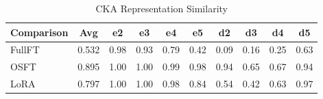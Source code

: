 \begin{table}[t]
\caption{CKA Representation Similarity}
\label{tab:cka}
\begin{tabular}{lccccccccc}
\toprule
Comparison & Avg & e2 & e3 & e4 & e5 & d2 & d3 & d4 & d5 \\
\midrule
FullFT & 0.532 & 0.98 & 0.93 & 0.79 & 0.42 & 0.09 & 0.16 & 0.25 & 0.63 \\
OSFT & 0.895 & 1.00 & 1.00 & 0.99 & 0.98 & 0.94 & 0.65 & 0.67 & 0.94 \\
LoRA & 0.797 & 1.00 & 1.00 & 0.98 & 0.84 & 0.54 & 0.42 & 0.63 & 0.97 \\
\bottomrule
\end{tabular}
\end{table}